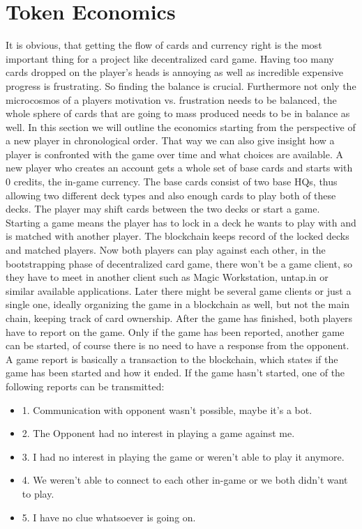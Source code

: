 \documentclass{article}
\begin{document}
\section{Token Economics}
%
It is obvious, that getting the flow of cards and currency right is the most important thing for a project like decentralized card game. Having too many cards dropped on the player's heads is annoying as well as incredible expensive progress is frustrating. So finding the balance is crucial. Furthermore not only the microcosmos of a players motivation vs. frustration needs to be balanced, the whole sphere of cards that are going to mass produced needs to be in balance as well. In this section we will outline the economics starting from the perspective of a new player in chronological order. That way we can also give insight how a player is confronted with the game over time and what choices are available.
%
\newline \newline
%
A new player who creates an account gets a whole set of base cards and starts with 0 credits, the in-game currency. The base cards consist of two base HQs, thus allowing two different deck types and also enough cards to play both of these decks. The player may shift cards between the two decks or start a game. Starting a game means the player has to lock in a deck he wants to play with and is matched with another player. The blockchain keeps record of the locked decks and matched players. Now both players can play against each other, in the bootstrapping phase of decentralized card game, there won't be a game client, so they have to meet in another client such as Magic Workstation\cite{MWS}, untap.in\cite{untapin} or similar available applications. Later there might be several game clients or just a single one, ideally organizing the game in a blockchain as well, but not the main chain, keeping track of card ownership. After the game has finished, both players have to report on the game. Only if the game has been reported, another game can be started, of course there is no need to have a response from the opponent. A game report is basically a transaction to the blockchain, which states if the game has been started and how it ended. If the game hasn't started, one of the following reports can be transmitted:
%
\begin{itemize}
	\item 1. Communication with opponent wasn't possible, maybe it's a bot.
	\item 2. The Opponent had no interest in playing a game against me.
	\item 3. I had no interest in playing the game or weren't able to play it anymore.
	\item 4. We weren't able to connect to each other in-game or we both didn't want to play.
	\item 5. I have no clue whatsoever is going on.
\end{itemize}
\end{document}

